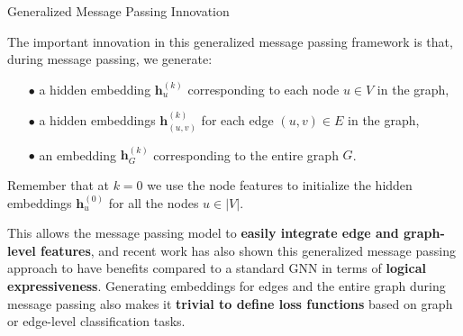 \documentclass[10pt, aspectratio=169, compress, protectframetitle, handout]{beamer}
\begin{document}
\begin{frame}{Generalized Message Passing Innovation}

    The important innovation in this generalized message passing framework is that, during message passing, we generate:
    \begin{itemize}
    \item[\alert{$\bullet$}] a hidden embedding $\mathbf h^{(k)}_u$ corresponding to \alert{each node} $u \in V$ in the graph,
    \item[\alert{$\bullet$}] a hidden embeddings $\mathbf h_{(u,v)}^{(k)}$ for \alert{each edge} $(u, v) \in E$ in the graph,
    \item[\alert{$\bullet$}] an embedding $\mathbf h_G^{(k)}$ corresponding to the \alert{entire graph} $G$.
    \end{itemize}
    
    Remember that at $k=0$ we use the node features to initialize the hidden embeddings $\mathbf h^{(0)}_u$ for all the nodes $u \in |V|$.
    
    This allows the message passing model to \textbf{easily integrate edge and graph-level features}, and recent work has also shown this generalized message passing approach to have benefits compared to a standard GNN in terms of \textbf{logical expressiveness}. Generating embeddings for edges and the entire graph during message passing also makes it \textbf{trivial to define loss functions} based on graph or edge-level classification tasks.
    
\end{frame}
\end{document}
